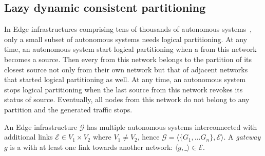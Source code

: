 


\subsection{Lazy dynamic consistent partitioning}
\label{subsec:lazy}

In Edge infrastructures comprising tens of thousands of autonomous
systems~\cite{nur2018crossas}, only a small subset of autonomous
systems needs logical partitioning. At any time, an autonomous system
start logical partitioning when a \process from this network becomes a
source.  Then every \process from this network belongs to the
partition of its closest source not only from their own network but
that of adjacent networks that started logical partitioning as well.
At any time, an autonomous system stops logical partitioning when the
last source from this network revokes its status of
source. Eventually, all nodes from this network do not belong to any
partition and the generated traffic stops.

\begin{definition}
  An Edge infrastructure $\mathcal{G}$ has multiple autonomous systems
  interconnected with additional links $\mathcal{E} \in V_1 \times
  V_2$ where $V_1 \neq V_2$, hence $\mathcal{G} = \langle \{G_1,
  \ldots G_n\}, \mathcal{E} \rangle$. A \emph{gateway} $g$ is a
  \process with at least one link towards another network: $\langle g,
  \_ \rangle \in \mathcal{E}$.
\end{definition}

